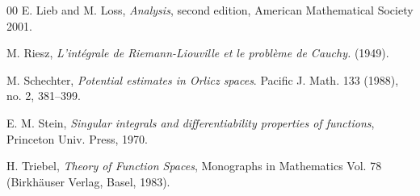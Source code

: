 \documentclass[leqno,twoside, 12pt]{amsart}
\theoremstyle{plain}
\numberwithin{equation}{section} \numberwithin{figure}{section}
\theoremstyle{definition}
\numberwithin{equation}{section}
\begin{document}
\begin{thebibliography}{00}
 E. Lieb and M. Loss, \emph{Analysis}, second edition, American Mathematical Society 2001.


M. Riesz,  \emph{L'intégrale de Riemann-Liouville et le problème de Cauchy.} (1949).

M. Schechter, \emph{Potential estimates in Orlicz spaces}. Pacific J. Math. 133 (1988), no. 2, 381--399.


 E. M. Stein, \emph{Singular integrals and differentiability properties of functions}, Princeton
Univ. Press, 1970.


H. Triebel, \emph{Theory of Function Spaces}, Monographs in Mathematics Vol. 78 (Birkhäuser Verlag, Basel, 1983).
 

 
\end{thebibliography}
\end{document}
